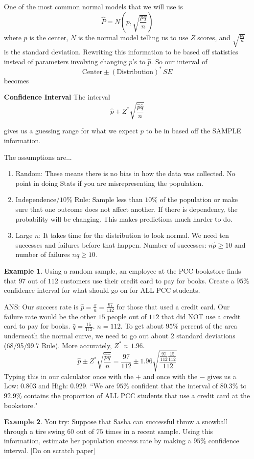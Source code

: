 \documentclass[12pt]{amsart}
\theoremstyle{definition}
\newtheorem{ex}{Example}
\begin{document}
\noindent One of the most common normal models that we will use is $$\hat{P}=N(p,\sqrt{\frac{pq}{n}})$$ where $p$ is the center, $N$ is the normal model telling us to use $Z$ scores, and $\sqrt{\frac{pq}{n}}$ is the standard deviation. Rewriting this information to be based off statistics instead of parameters involving changing $p$'s to $\hat{p}$. So our interval of $$\text{Center}\pm (\text{Distribution})^*\,SE$$ becomes
 \begin{framed} \textbf{Confidence Interval} The interval $$\hat{p}\pm Z^*\sqrt{\frac{\hat{p}\hat{q}}{n}}$$
 	
 	gives us a guessing range for what we expect $p$ to be in based off the SAMPLE information.
 	
 \end{framed}
 The assumptions are...
 \begin{enumerate}
 	\item Random: These means there is no bias in how the data was collected. No point in doing Stats if you are misrepresenting the population.
 	\item Independence/$10\%$ Rule: Sample less than $10\%$ of the population or make sure that one outcome does not affect another. If there is dependency, the probability will be changing. This makes predictions much harder to do.
 	\item Large $n$: It takes time for the distribution to look normal. We need ten successes and failures before that happen. Number of successes: $n\hat{p}\geq 10$ and number of failures $n\hat{q}\geq 10$.
 \end{enumerate}
 
 \begin{ex} Using a random sample, an employee at the PCC bookstore finds that $97$ out of $112$ customers use their credit card to pay for books. Create a $95\%$ confidence interval for what should go on for ALL PCC students.\end{ex}
\noindent ANS: Our success rate is $\hat{p}=\frac{x}{n}=\frac{97}{112}$ for those that used a credit card. Our failure rate would be the other $15$ people out of $112$ that did NOT use a credit card to pay for books. $\hat{q}=\frac{15}{112}$. $n=112$. To get about $95\%$ percent of the area underneath the normal curve, we need to go out about $2$ standard deviations (68/95/99.7 Rule). More accurately, $Z^*\approx 1.96$.
$$\hat{p}\pm Z^*\sqrt{\frac{\hat{p}\hat{q}}{n}}=\frac{97}{112}\pm 1.96\sqrt{\frac{\frac{97}{112}\frac{15}{112}}{112}}$$ Typing this in our calculator once with the $+$ and once with the $-$ gives us a Low: $0.803$ and High: $0.929$. ``We are $95\%$ confident that the interval of $80.3\%$ to $92.9\%$ contains the proportion of ALL PCC students that use a credit card at the bookstore."
 \newpage\begin{ex} You try: Suppose that Sasha can successful throw a snowball through a tire swing $60$ out of $75$ times in a recent sample. Using this information, estimate her population success rate by making a $95\%$ confidence interval. [Do on scratch paper]\end{ex}
\end{document}
